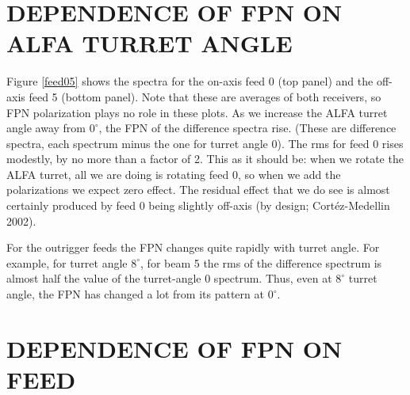 \documentclass[psfig,preprint]{aastex}
\begin{document}
\section{DEPENDENCE OF FPN ON ALFA TURRET ANGLE} \label{turret}

	Figure \ref{feed05} shows the spectra for the on-axis feed 0
(top panel) and the off-axis feed 5 (bottom panel).  Note that these are
averages of both receivers, so FPN polarization plays no role in these
plots.  As we increase the ALFA turret angle away from $0^\circ$, the
FPN of the difference spectra rise.  (These are difference spectra, each
spectrum minus the one for turret angle 0).  The rms for feed 0 rises
modestly, by no more than a factor of 2.  This as it should be: when we
rotate the ALFA turret, all we are doing is rotating feed 0, so when we
add the polarizations we expect zero effect.  The residual effect that
we do see is almost certainly produced by feed 0 being slightly off-axis
(by design; Cort\'ez-Medellin 2002). 

	For the outrigger feeds the FPN changes quite rapidly with
turret angle.  For example, for turret angle $8^\circ$, for beam 5 the
rms of the difference spectrum is almost half the value of the
turret-angle 0 spectrum.  Thus, even at $8^\circ$ turret angle, the FPN
has changed a lot from its pattern at $0^\circ$. 

\section{DEPENDENCE OF FPN ON FEED} \label{beam}
\end{document}

